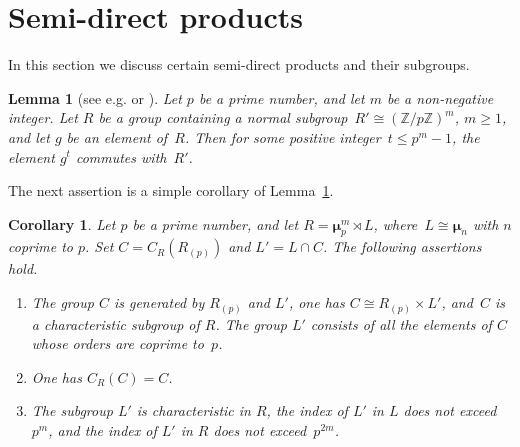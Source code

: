 \documentclass[12pt]{amsart}
\numberwithin{equation}{section}
\newtheorem{corollary}[subsection]{Corollary}
\newtheorem{lemma}[subsection]{Lemma}
\theoremstyle{definition}
\newcommand{\mumu}{\boldsymbol{\mu}}
\def \ge {\geqslant}
\def \le {\leqslant}
\begin{document}
\section{Semi-direct products}
\label{section:semi-direct}

In this section we discuss certain semi-direct products and their subgroups.

\begin{lemma}[{see e.g. \cite[Lemma~2.11]{ChenShramov} or \cite[Corollary~2]{Darafsheh}}]
\label{lemma:Darafsheh}
Let $p$ be a prime number, and let $m$ be a non-negative integer. Let $R$ be a group containing a
normal subgroup~\mbox{$R'\cong (\mathbb{Z}/p\mathbb{Z})^m$}, $m\ge 1$, and let $g$ be an element of~$R$. Then for some positive integer~\mbox{$t\le p^m-1$}, the element $g^t$ commutes with~$R'$.
\end{lemma}


The next assertion is a simple corollary of Lemma~\ref{lemma:Darafsheh}.

\begin{corollary}
\label{corollary:Darafsheh}
Let $p$ be a prime number, and let $R=\mumu_p^m\rtimes L$,
where~\mbox{$L\cong \mumu_n$} with $n$ coprime to $p$.
Set $C=C_R(R_{(p)})$ and  $L'=L\cap C$.
The following assertions hold.
\begin{enumerate}
\item[(i)] The group $C$ is generated by $R_{(p)}$ and $L'$, one has $C\cong R_{(p)}\times L'$,
and~$C$ is a characteristic subgroup of $R$. The group $L'$ consists of all the elements of $C$ whose orders are coprime to~$p$.

\item[(ii)] One has $C_R(C)=C$.

\item[(iii)]  The subgroup $L'$ is characteristic in $R$,
the index of $L'$ in $L$ does not exceed~$p^m$,
and the index of $L'$ in $R$ does not exceed~$p^{2m}$.
\end{enumerate}
\end{corollary}
\end{document}
